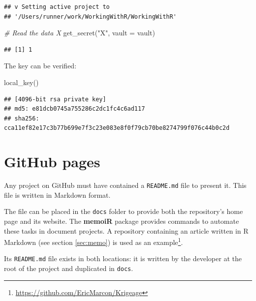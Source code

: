 \documentclass[
  12pt,
  american,
  a4paper,
  extrafontsizes,onecolumn,openright
  ]{memoir}
\newenvironment{Shaded}{\begin{snugshade}}{\end{snugshade}}
\newcommand{\AttributeTok}[1]{\textcolor[rgb]{0.77,0.63,0.00}{#1}}
\newcommand{\CommentTok}[1]{\textcolor[rgb]{0.56,0.35,0.01}{\textit{#1}}}
\newcommand{\FunctionTok}[1]{\textcolor[rgb]{0.00,0.00,0.00}{#1}}
\newcommand{\NormalTok}[1]{#1}
\newcommand{\StringTok}[1]{\textcolor[rgb]{0.31,0.60,0.02}{#1}}
\begin{document}
\begin{verbatim}
## v Setting active project to
## '/Users/runner/work/WorkingWithR/WorkingWithR'
\end{verbatim}

\begin{Shaded}
\begin{Highlighting}[]
\CommentTok{\# Read the data \textquotesingle{}X}
\FunctionTok{get\_secret}\NormalTok{(}\StringTok{"X"}\NormalTok{, }\AttributeTok{vault =}\NormalTok{ vault)}
\end{Highlighting}
\end{Shaded}

\begin{verbatim}
## [1] 1
\end{verbatim}

\normalsize

The key can be verified:

\scriptsize

\begin{Shaded}
\begin{Highlighting}[]
\FunctionTok{local\_key}\NormalTok{()}
\end{Highlighting}
\end{Shaded}

\begin{verbatim}
## [4096-bit rsa private key]
## md5: e81dcb0745a755286c2dc1fc4c6ad117
## sha256: cca11ef82e17c3b77b699e7f3c23e083e8f0f79cb70be8274799f076c44b0c2d
\end{verbatim}

\normalsize

\hypertarget{sec:github-pages}{%
\section{GitHub pages}\label{sec:github-pages}}

Any project on GitHub must have contained a \texttt{README.md} file to present it.
This file is written in Markdown format.

The file can be placed in the \texttt{docs} folder to provide both the repository's home page and its website.
The \textbf{memoiR} package provides commands to automate these tasks in document projects.
A repository containing an article written in R Markdown (see section \ref{sec:memo}) is used as an example\footnote{\url{https://github.com/EricMarcon/Krigeage}}.

Its \texttt{README.md} file exists in both locations: it is written by the developer at the root of the project and duplicated in \texttt{docs}.
\end{document}
